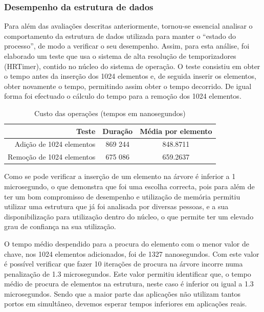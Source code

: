 \documentclass[a4paper]{llncs}
\begin{document}
\subsubsection{Desempenho da estrutura de dados}

Para além das avaliações descritas anteriormente, tornou-se essencial analisar o comportamento da estrutura de dados utilizada para manter o “estado do processo”, de modo a verificar o seu desempenho. 
 Assim, para esta análise, foi elaborado um teste que usa o sistema de alta resolução de temporizadores (HRTimer), contido no núcleo do sistema de operação.
 O teste consistiu em obter o tempo antes da inserção dos 1024 elementos e, de seguida inserir os elementos, obter novamente o tempo, permitindo assim obter o tempo decorrido.
 De igual forma foi efectuado o cálculo do tempo para a remoção dos 1024 elementos.

\begin{table}
\begin{center}

\begin{tabular}{ | r | c | c | }
\hline
\hspace{1cm} Teste \hspace{1.5cm} & \hspace{1cm}Duração\hspace{1cm} &  Média por
elemento \\
\hline
Adição de 1024 elementos & 869 244 & 848.8711 \\
\hline
Remoção de 1024 elementos & 675 086 & 659.2637\\
\hline

\hline
\end{tabular}
\caption{Custo das operações (tempos em nanosegundos)}
\label{tab:tree_info}
\end{center}
\end{table}

Como se pode verificar a inserção de um elemento na árvore é inferior a 1 microsegundo, o que demonstra que foi uma escolha correcta, pois para além de ter um bom compromisso de desempenho e utilização de memória permitiu utilizar uma estrutura que já foi analisada por diversas pessoas, e a sua disponibilização para utilização dentro do núcleo, o que permite ter um elevado grau de confiança na sua utilização.

O tempo médio despendido para a procura do elemento com o menor valor de chave, nos 1024 elementos adicionados, foi de 1327 nanosegundos.
 Com este valor é possível verificar que fazer 10 iterações de procura na árvore incorre numa penalização de 1.3 microsegundos.
 Este valor permitiu identificar que, o tempo médio de procura de elementos na estrutura, neste caso é inferior ou igual a 1.3 microsegundos.
 Sendo que a maior parte das aplicações não utilizam tantos portos em simultâneo, devemos esperar tempos inferiores em aplicações reais.
\end{document}
